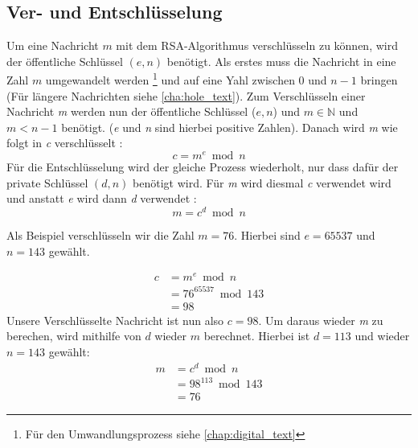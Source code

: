 \documentclass[12pt,a4paper]{scrartcl}
\begin{document}
	\subsection{Ver- und Entschlüsselung}
	Um eine Nachricht $m$ mit dem RSA-Algorithmus verschlüsseln zu können, wird der öffentliche Schlüssel $(e,n)$ benötigt.
	Als erstes muss die Nachricht in eine Zahl $m$ umgewandelt werden \footnote{Für den Umwandlungsprozess siehe \ref{chap:digital_text}} und auf eine Yahl zwischen 0 und $n-1$ bringen (Für längere Nachrichten siehe \ref{cha:hole_text}).
	Zum Verschlüsseln einer Nachricht \textit{m} werden nun der öffentliche Schlüssel ($e, n$) und $m \in \mathbb{N}$ und $m < n-1$ benötigt. (\textit{e} und \textit{n} sind hierbei positive Zahlen).\cite[6]{rsaOriginalPaper} Danach wird \textit{m} wie folgt in \textit{c} verschlüsselt \cite[S.6]{rsaOriginalPaper}: 
	$$c = m^e \bmod n$$
	Für die Entschlüsselung wird der gleiche Prozess wiederholt, nur dass dafür der private Schlüssel $(d,n)$ benötigt wird. Für \textit{m} wird diesmal \textit{c} verwendet wird und anstatt \textit{e} wird dann \textit{d} verwendet \cite[S.6]{rsaOriginalPaper}:
	$$m = c^d \bmod n$$
	
	
	Als Beispiel verschlüsseln wir die Zahl $m = 76$. Hierbei sind $e=65537$ und $n=143$ gewählt.

	\begin{equation}
	\begin{split}
	c & = m^e \bmod n \\
	 &  = 76^{65537} \bmod 143 \\
 	& = 98
	\end{split}
	\end{equation}
	Unsere Verschlüsselte Nachricht ist nun also $c = 98$. Um daraus wieder \textit{m} zu berechen, wird mithilfe von $d$ wieder $m$ berechnet. Hierbei ist $d=113$ und wieder $n=143$ gewählt:
	\begin{equation}
	\begin{split}
	m & = c^d \bmod n \\
	 &  = 98^{113} \bmod 143 \\
 	& = 76
	\end{split}
	\end{equation}
	
\end{document}
